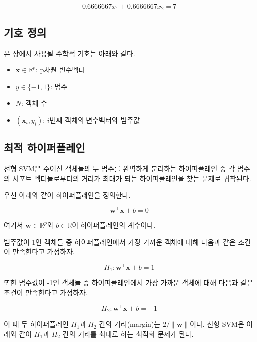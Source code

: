 \documentclass[]{book}
\providecommand{\tightlist}{%
  \setlength{\itemsep}{0pt}\setlength{\parskip}{0pt}}
\begin{document}
\[
0.6666667 x_{1} + 0.6666667 x_{2} = 7
\]

\hypertarget{linear-svm-notation}{%
\subsection{기호 정의}\label{linear-svm-notation}}

본 장에서 사용될 수학적 기호는 아래와 같다.

\begin{itemize}
\tightlist
\item
  \(\mathbf{x} \in \mathbb{R}^p\): p차원 변수벡터
\item
  \(y \in \{-1, 1\}\): 범주
\item
  \(N\): 객체 수
\item
  \((\mathbf{x}_i, y_i)\): \(i\)번째 객체의 변수벡터와 범주값
\end{itemize}

\hypertarget{linear-svm-separable-hyperplane}{%
\subsection{최적 하이퍼플레인}\label{linear-svm-separable-hyperplane}}

선형 SVM은 주어진 객체들의 두 범주를 완벽하게 분리하는 하이퍼플레인 중 각 범주의 서포트 벡터들로부터의 거리가 최대가 되는 하이퍼플레인을 찾는 문제로 귀착된다.

우선 아래와 같이 하이퍼플레인을 정의한다.

\begin{equation}
\mathbf{w}^\top \mathbf{x} + b = 0 \label{eq:linear-svm-hyperplane}
\end{equation}

여기서 \(\mathbf{w} \in \mathbb{R}^p\)와 \(b \in \mathbb{R}\)이 하이퍼플레인의 계수이다.

범주값이 1인 객체들 중 하이퍼플레인에서 가장 가까운 객체에 대해 다음과 같은 조건이 만족한다고 가정하자.

\[
H_1: \mathbf{w}^\top \mathbf{x} + b = 1 
\]

또한 범주값이 -1인 객체들 중 하이퍼플레인에서 가장 가까운 객체에 대해 다음과 같은 조건이 만족한다고 가정하자.

\[
H_2: \mathbf{w}^\top \mathbf{x} + b = -1
\]

이 때 두 하이퍼플레인 \(H_1\)과 \(H_2\) 간의 거리(margin)는 \(2 / \lVert \mathbf{w} \rVert\)이다. 선형 SVM은 아래와 같이 \(H_1\)과 \(H_2\) 간의 거리를 최대로 하는 최적화 문제가 된다.
\end{document}
